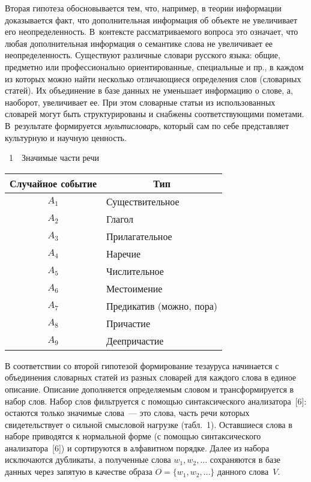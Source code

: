 \begin{multicols}{2}
     Вторая гипотеза обосновывается тем, что, например, в теории 
информации доказывается факт, что дополнительная информация об объекте не 
увеличивает его неопределенность. В~контексте рассматриваемого вопроса это 
означает, что любая дополнительная информация о семантике слова не 
увеличивает ее неопределенность. Существуют различные словари русского 
языка: общие, предметно или профессионально ориентированные, специальные 
и пр., в каждом из которых можно найти несколько отличающиеся определения 
слов (словарных статей). Их объединение в базе данных не уменьшает 
информацию о слове, а, наоборот, увеличивает ее. При этом словарные статьи из 
использованных словарей могут быть структурированы и снабжены 
соответствующими пометами. В~результате формируется 
\textit{мультисловарь}, который сам по себе представляет культурную и 
научную ценность.

{\small
\begin{center}
{{\normalsize \tablename~1}\ \ \small{Значимые части речи}}

\vspace*{6pt}

\begin{tabular}{|c|l|}
\hline
Случайное событие&\multicolumn{1}{c|}{Тип}\\
\hline
$A_1$&Существительное\\
$A_2$&Глагол\\
$A_3$&Прилагательное\\
$A_4$&Наречие\\
$A_5$&Числительное\\
$A_6$&Местоимение\\
$A_7$&Предикатив (можно, пора)\\
$A_8$&Причастие\\
$A_9$&Деепричастие\\
\hline
\end{tabular}
\end{center}
}

\vspace*{12pt}

\addtocounter{table}{1}

     
     В соответствии со второй гипотезой формирование тезауруса начинается 
с объединения словарных статей из разных словарей для каждого слова в 
единое описание. Описание дополняется определяемым словом и 
трансформируется в набор слов. Набор слов фильтруется с помощью 
синтаксического анализатора~[6]: остаются только значимые слова~--- это 
слова, часть речи которых свидетельствует о сильной смысловой нагрузке 
(табл.~1). Остав\-ши\-еся слова в наборе приводятся к нормальной форме (с 
помощью синтаксического анализатора~[6]) и сортируются в алфавитном 
порядке. Далее из набора исключаются дубликаты, а полученные слова $w_1, 
w_2,\ldots$ сохраняются в базе данных через запятую в качестве {образа} 
$O=\{w_1,w_2,\ldots\}$ данного слова~$V$. 
     

\end{multicols}

